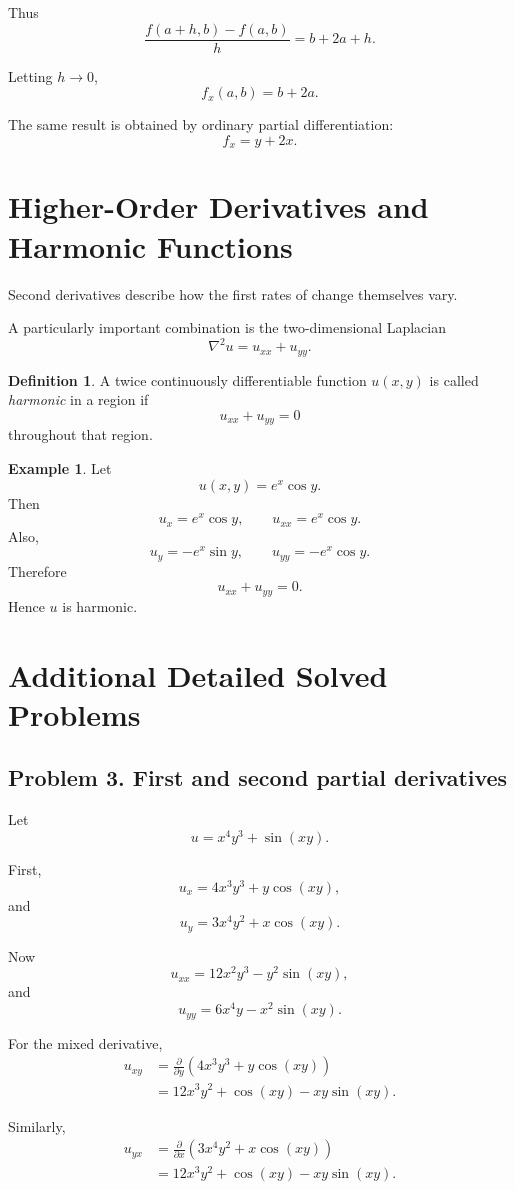 \documentclass[11pt,oneside]{book}
\theoremstyle{studentthm}
\theoremstyle{definition}
\newtheorem{definition}[theorem]{Definition}
\newtheorem{example}[theorem]{Example}
\begin{document}
Thus
\[
\frac{
f(a+h,b)-f(a,b)
}{h}
=
b+2a+h.
\]

Letting \(h\to0\),
\[
f_x(a,b)=b+2a.
\]

The same result is obtained by ordinary partial differentiation:
\[
f_x=y+2x.
\]

\section{Higher-Order Derivatives and Harmonic Functions}

Second derivatives describe how the first rates of change themselves
vary.

A particularly important combination is the two-dimensional Laplacian
\[
\nabla^2u
=
u_{xx}+u_{yy}.
\]

\begin{definition}
A twice continuously differentiable function \(u(x,y)\) is called
\emph{harmonic} in a region if
\[
u_{xx}+u_{yy}=0
\]
throughout that region.
\end{definition}

\begin{example}
Let
\[
u(x,y)=e^x\cos y.
\]
Then
\[
u_x=e^x\cos y,
\qquad
u_{xx}=e^x\cos y.
\]
Also,
\[
u_y=-e^x\sin y,
\qquad
u_{yy}=-e^x\cos y.
\]
Therefore
\[
u_{xx}+u_{yy}=0.
\]
Hence \(u\) is harmonic.
\end{example}

\section{Additional Detailed Solved Problems}

\subsection*{Problem 3. First and second partial derivatives}

Let
\[
u=x^4y^3+\sin(xy).
\]

First,
\[
u_x
=
4x^3y^3+y\cos(xy),
\]
and
\[
u_y
=
3x^4y^2+x\cos(xy).
\]

Now
\[
u_{xx}
=
12x^2y^3-y^2\sin(xy),
\]
and
\[
u_{yy}
=
6x^4y-x^2\sin(xy).
\]

For the mixed derivative,
\[
\begin{aligned}
u_{xy}
&=
\frac{\partial}{\partial y}
\left(
4x^3y^3+y\cos(xy)
\right)\\
&=
12x^3y^2+\cos(xy)-xy\sin(xy).
\end{aligned}
\]

Similarly,
\[
\begin{aligned}
u_{yx}
&=
\frac{\partial}{\partial x}
\left(
3x^4y^2+x\cos(xy)
\right)\\
&=
12x^3y^2+\cos(xy)-xy\sin(xy).
\end{aligned}
\]
\end{document}
